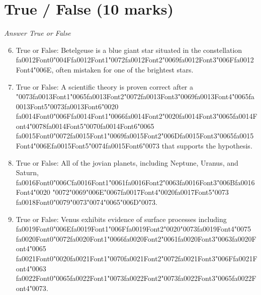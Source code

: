 \documentclass[12pt]{article}
\begin{document}
\section*{True / False (10 marks)}
\textit{Answer True or False}
\begin{enumerate}[label=\arabic*.]
\setcounter{enumi}{5}
\item True or False: Betelgeuse is a blue giant star situated in the constellation {\csname fa0012Font0\endcsname\char"004F}{\csname fa0012Font1\endcsname\char"0072}{\csname fa0012Font2\endcsname\char"0069}{\csname fa0012Font3\endcsname\char"006F}{\csname fa0012Font4\endcsname\char"006E}, often mistaken for one of the brightest stars.
\item True or False: A scientific theory is proven correct after a {\char"0073}{\csname fa0013Font1\endcsname\char"0065}{\csname fa0013Font2\endcsname\char"0072}{\csname fa0013Font3\endcsname\char"0069}{\csname fa0013Font4\endcsname\char"0065}{\csname fa0013Font5\endcsname\char"0073}{\csname fa0013Font6\endcsname\char"0020} {\csname fa0014Font0\endcsname\char"006F}{\csname fa0014Font1\endcsname\char"0066}{\csname fa0014Font2\endcsname\char"0020}{\csname fa0014Font3\endcsname\char"0065}{\csname fa0014Font4\endcsname\char"0078}{\csname fa0014Font5\endcsname\char"0070}{\csname fa0014Font6\endcsname\char"0065} {\csname fa0015Font0\endcsname\char"0072}{\csname fa0015Font1\endcsname\char"0069}{\csname fa0015Font2\endcsname\char"006D}{\csname fa0015Font3\endcsname\char"0065}{\csname fa0015Font4\endcsname\char"006E}{\csname fa0015Font5\endcsname\char"0074}{\csname fa0015Font6\endcsname\char"0073} that supports the hypothesis.
\item True or False: All of the jovian planets, including Neptune, Uranus, and Saturn, {\csname fa0016Font0\endcsname\char"006C}{\csname fa0016Font1\endcsname\char"0061}{\csname fa0016Font2\endcsname\char"0063}{\csname fa0016Font3\endcsname\char"006B}{\csname fa0016Font4\endcsname\char"0020} {\char"0072}{\char"0069}{\char"006E}{\char"0067}{\csname fa0017Font4\endcsname\char"0020}{\csname fa0017Font5\endcsname\char"0073} {\csname fa0018Font0\endcsname\char"0079}{\char"0073}{\char"0074}{\char"0065}{\char"006D}{\char"0073}.
\item True or False: Venus exhibits evidence of surface processes including {\csname fa0019Font0\endcsname\char"006E}{\csname fa0019Font1\endcsname\char"006F}{\csname fa0019Font2\endcsname\char"0020}{\char"0073}{\csname fa0019Font4\endcsname\char"0075} {\csname fa0020Font0\endcsname\char"0072}{\csname fa0020Font1\endcsname\char"0066}{\csname fa0020Font2\endcsname\char"0061}{\csname fa0020Font3\endcsname\char"0063}{\csname fa0020Font4\endcsname\char"0065} {\csname fa0021Font0\endcsname\char"0020}{\csname fa0021Font1\endcsname\char"0070}{\csname fa0021Font2\endcsname\char"0072}{\csname fa0021Font3\endcsname\char"006F}{\csname fa0021Font4\endcsname\char"0063} {\csname fa0022Font0\endcsname\char"0065}{\csname fa0022Font1\endcsname\char"0073}{\csname fa0022Font2\endcsname\char"0073}{\csname fa0022Font3\endcsname\char"0065}{\csname fa0022Font4\endcsname\char"0073}.

\end{enumerate}
\end{document}
